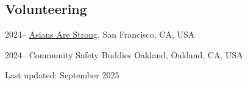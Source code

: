 \documentclass[11pt,letterpaper]{article}
\begin{document}
\subsection{Volunteering}
\begin{tablist}
  \item[2024– ] \tab{}\href{https://asiansarestrong.org/}{Asians Are Strong}, San Francisco, CA, USA
  \item[2024– ] \tab{}Community Safety Buddies Oakland, Oakland, CA, USA
\end{tablist}

\vspace{1.0\baselineskip}
{\footnotesize Last updated: September 2025}
\end{document}
